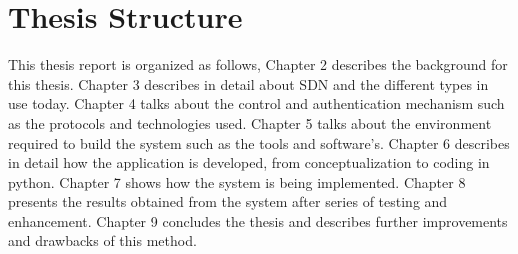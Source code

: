 \section{Thesis Structure}\label{sec:Structure}
This thesis report is organized as follows, Chapter 2 describes the background for this thesis. Chapter 3 describes in detail about SDN and the different types in use today. Chapter 4 talks about the control and authentication mechanism such as the protocols and technologies used. Chapter 5 talks about the environment required to build the system such as the tools and software’s. Chapter 6 describes in detail how the application is developed, from conceptualization to coding in python. Chapter 7 shows how the system is being implemented. Chapter 8 presents the results obtained from the system after series of testing and enhancement. Chapter 9 concludes the thesis and describes further improvements and drawbacks of this method.